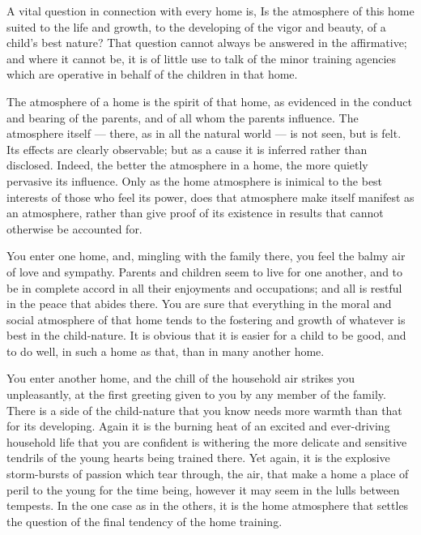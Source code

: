 \documentclass[
]{book}
\begin{document}
A vital question in connection with every home is, Is the atmosphere of this home suited to the life and growth, to the developing of the vigor and beauty, of a child's best nature? That question cannot always be answered in the affirmative; and where it cannot be, it is of little use to talk of the minor training agencies which are operative in behalf of the children in that home.

The atmosphere of a home is the spirit of that home, as evidenced in the conduct and bearing of the parents, and of all whom the parents influence. The atmosphere itself --- there, as in all the natural world --- is not seen, but is felt. Its effects are clearly observable; but as a cause it is inferred rather than disclosed. Indeed, the better the atmosphere in a home, the more quietly pervasive its influence. Only as the home atmosphere is inimical to the best interests of those who feel its power, does that atmosphere make itself manifest as an atmosphere, rather than give proof of its existence in results that cannot otherwise be accounted for.

You enter one home, and, mingling with the family there, you feel the balmy air of love and sympathy. Parents and children seem to live for one another, and to be in complete accord in all their enjoyments and occupations; and all is restful in the peace that abides there. You are sure that everything in the moral and social atmosphere of that home tends to the fostering and growth of whatever is best in the child-nature. It is obvious that it is easier for a child to be good, and to do well, in such a home as that, than in many another home.

You enter another home, and the chill of the household air strikes you unpleasantly, at the first greeting given to you by any member of the family. There is a side of the child-nature that you know needs more warmth than that for its developing. Again it is the burning heat of an excited and ever-driving household life that you are confident is withering the more delicate and sensitive tendrils of the young hearts being trained there. Yet again, it is the explosive storm-bursts of passion which tear through, the air, that make a home a place of peril to the young for the time being, however it may seem in the lulls between tempests. In the one case as in the others, it is the home atmosphere that settles the question of the final tendency of the home training.
\end{document}
